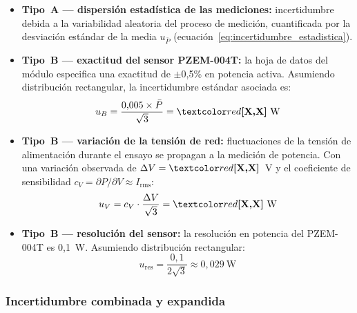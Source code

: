 \begin{itemize}
    \item \textbf{Tipo~A — dispersión estadística de las mediciones:}
          incertidumbre debida a la variabilidad aleatoria del proceso
          de medición, cuantificada por la desviación estándar de la
          media $u_{\bar{P}}$ (ecuación~\ref{eq:incertidumbre_estadistica}).

    \item \textbf{Tipo~B — exactitud del sensor PZEM-004T:}
          la hoja de datos del módulo especifica una exactitud de
          $\pm$0{,}5\% en potencia activa.
          Asumiendo distribución rectangular, la incertidumbre
          estándar asociada es:
          \begin{equation}
              u_B = \frac{0{,}005 \times \bar{P}}{\sqrt{3}}
                  = \PLACEHOLDER{X{,}X}~\text{W}
              \label{eq:incertidumbre_B}
          \end{equation}

    \item \textbf{Tipo~B — variación de la tensión de red:}
          fluctuaciones de la tensión de alimentación durante el
          ensayo se propagan a la medición de potencia.
          Con una variación observada de $\Delta V = \PLACEHOLDER{X{,}X}$~V
          y el coeficiente de sensibilidad
          $c_V = \partial P / \partial V \approx I_{\text{rms}}$:
          \begin{equation}
              u_{V} = c_V \cdot \frac{\Delta V}{\sqrt{3}}
                    = \PLACEHOLDER{X{,}X}~\text{W}
              \label{eq:incertidumbre_V}
          \end{equation}

    \item \textbf{Tipo~B — resolución del sensor:}
          la resolución en potencia del PZEM-004T es 0{,}1~W.
          Asumiendo distribución rectangular:
          \begin{equation}
              u_{\text{res}} = \frac{0{,}1}{2\sqrt{3}}
                             \approx 0{,}029~\text{W}
              \label{eq:incertidumbre_res}
          \end{equation}
\end{itemize}

\subsubsection{Incertidumbre combinada y expandida}

